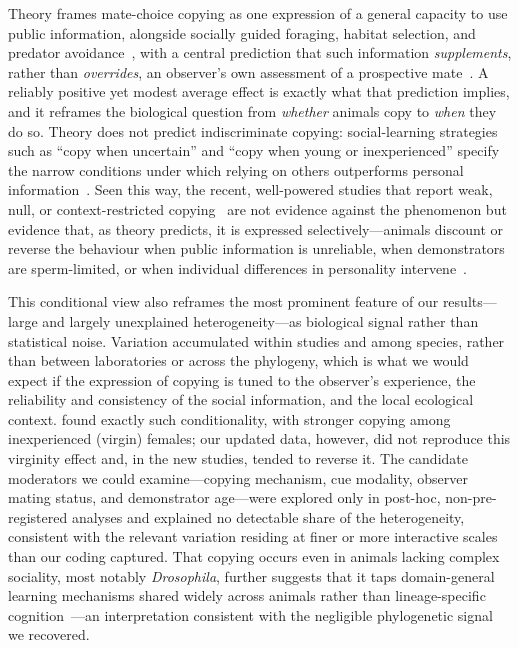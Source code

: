 Theory frames mate-choice copying as one expression of a general capacity to use public information, alongside socially guided foraging, habitat selection, and predator avoidance~\cite{danchinCulturalFliesConformist2018, galefjr.SocialLearningAnimals2005, valonePublicInformationAssessment2002}, with a central prediction that such information \emph{supplements}, rather than \emph{overrides}, an observer's own assessment of a prospective mate~\cite{vakirtzisMateChoiceCopying2011, ueharaMatechoiceCopyingBayesian2005}. A reliably positive yet modest average effect is exactly what that prediction implies, and it reframes the biological question from \textit{whether} animals copy to \textit{when} they do so. Theory does not predict indiscriminate copying: social-learning strategies such as ``copy when uncertain'' and ``copy when young or inexperienced'' specify the narrow conditions under which relying on others outperforms personal information~\cite{lalandSocialLearningStrategies2004, galefjr.SocialLearningAnimals2005}. Seen this way, the recent, well-powered studies that report weak, null, or context-restricted copying~\cite{nobelNoEvidenceMate2023, belkinaMateChoiceCopying2021, pusiakRelativeSexualAttractiveness2020} are not evidence against the phenomenon but evidence that, as theory predicts, it is expressed selectively---animals discount or reverse the behaviour when public information is unreliable, when demonstrators are sperm-limited, or when individual differences in personality intervene~\cite{loyauWhenNotCopy2012, dugatkinDisruptionHypothesisDoes2003, nobelImportancePopulationHeterogeneities2022}.

This conditional view also reframes the most prominent feature of our results---large and largely unexplained heterogeneity---as biological signal rather than statistical noise. Variation accumulated within studies and among species, rather than between laboratories or across the phylogeny, which is what we would expect if the expression of copying is tuned to the observer's experience, the reliability and consistency of the social information, and the local ecological context. \textcite{jonesMechanismsSocialInfluence2019} found exactly such conditionality, with stronger copying among inexperienced (virgin) females; our updated data, however, did not reproduce this virginity effect and, in the new studies, tended to reverse it. The candidate moderators we could examine---copying mechanism, cue modality, observer mating status, and demonstrator age---were explored only in post-hoc, non-pre-registered analyses and explained no detectable share of the heterogeneity, consistent with the relevant variation residing at finer or more interactive scales than our coding captured. That copying occurs even in animals lacking complex sociality, most notably \textit{Drosophila}, further suggests that it taps domain-general learning mechanisms shared widely across animals rather than lineage-specific cognition~\cite{bridgesAnimalBehaviourConformity2019a, danchinCulturalFliesConformist2018}---an interpretation consistent with the negligible phylogenetic signal we recovered.

